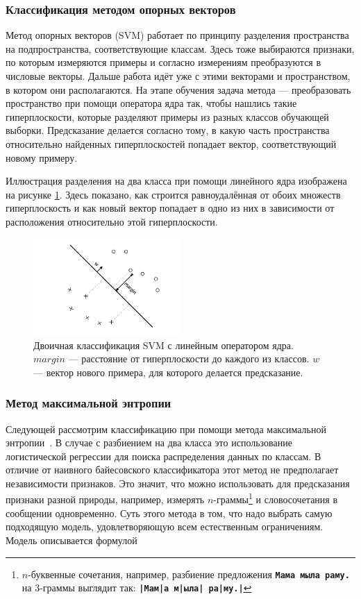 \subsubsection{Классификация методом опорных векторов}
Метод опорных векторов (SVM) \cite{tong2002support} работает по принципу разделения пространства на
подпространства, соответствующие классам. Здесь тоже выбираются признаки, по которым измеряются
примеры и согласно измерениям преобразуются в числовые векторы. Дальше работа идёт уже с этими векторами и
пространством, в котором они располагаются. На этапе обучения задача метода --- преобразовать
пространство при помощи оператора ядра так, чтобы нашлись такие гиперплоскости,
которые разделяют примеры из разных классов обучающей выборки. Предсказание делается
согласно тому, в какую часть пространства относительно найденных гиперплоскостей попадает вектор,
соответствующий новому примеру.

Иллюстрация разделения на два класса при помощи линейного ядра изображена на рисунке
\ref{linear_svm}. Здесь показано, как строится равноудалённая от обоих множеств гиперплоскость и как
новый вектор попадает в одно из них в зависимости от расположения относительно этой гиперплоскости.

\begin{figure}
  \centering
  \includegraphics[width=0.5\textwidth]{linear_svm}
  \caption{Двоичная классификация SVM с линейным оператором ядра. $margin$ --- расстояние от
    гиперплоскости до каждого из классов. $w$ --- вектор нового примера, для которого делается предсказание.}\label{linear_svm}
\end{figure}

\subsubsection{Метод максимальной энтропии}
Следующей рассмотрим классификацию при помощи метода максимальной энтропии~\cite{nigam1999using}. В
случае с разбиением на два класса это использование логистической регрессии для поиска распределения
данных по классам. В отличие от наивного байесовского классификатора этот метод не
предполагает независимости признаков. Это значит, что можно использовать для предсказания признаки
разной природы, например, измерять $n$-граммы\footnote{$n$-буквенные сочетания, например, разбиение
  предложения \textbf{\texttt{Мама мыла раму.}}
  на 3-граммы выглядит так: \textbf{\texttt{|Мам|а м|ыла| ра|му.|}}} и словосочетания в сообщении одновременно.
Суть этого метода в том, что надо выбрать самую
подходящую модель, удовлетворяющую всем естественным ограничениям. Модель описывается формулой

